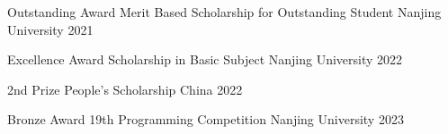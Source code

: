 



\begin{cvhonors}

  \cvhonor
    {Outstanding Award} %
    {Merit Based Scholarship for Outstanding Student} %
    {Nanjing University} %
    {2021} %

  \cvhonor
    {Excellence Award} %
    {Scholarship in Basic Subject} %
    {Nanjing University} %
    {2022} %

  \cvhonor
    {2nd Prize} %
    {People's Scholarship} %
    {China} %
    {2022} %

  \cvhonor
    {Bronze Award } %
    {19th Programming Competition} %
    {Nanjing University} %
    {2023} %


\end{cvhonors}






